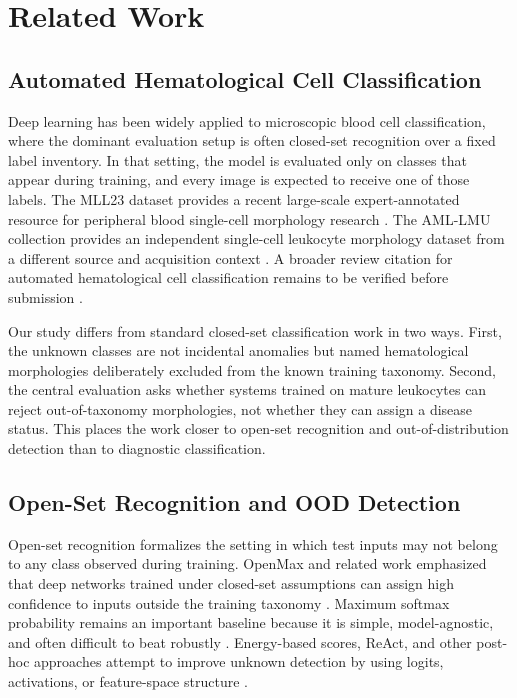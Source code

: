 \section{Related Work}

\subsection{Automated Hematological Cell Classification}

Deep learning has been widely applied to microscopic blood cell classification, where the dominant evaluation setup is often closed-set recognition over a fixed label inventory. In that setting, the model is evaluated only on classes that appear during training, and every image is expected to receive one of those labels. The MLL23 dataset provides a recent large-scale expert-annotated resource for peripheral blood single-cell morphology research \cite{mll23_nature_2025,mll23_zenodo_2024}. The AML-LMU collection provides an independent single-cell leukocyte morphology dataset from a different source and acquisition context \cite{aml_lmu_tcia_2019}. A broader review citation for automated hematological cell classification remains to be verified before submission \cite{TODO_hematology_ai_review}.

Our study differs from standard closed-set classification work in two ways. First, the unknown classes are not incidental anomalies but named hematological morphologies deliberately excluded from the known training taxonomy. Second, the central evaluation asks whether systems trained on mature leukocytes can reject out-of-taxonomy morphologies, not whether they can assign a disease status. This places the work closer to open-set recognition and out-of-distribution detection than to diagnostic classification.

\subsection{Open-Set Recognition and OOD Detection}

Open-set recognition formalizes the setting in which test inputs may not belong to any class observed during training. OpenMax and related work emphasized that deep networks trained under closed-set assumptions can assign high confidence to inputs outside the training taxonomy \cite{bendale2016openmax}. Maximum softmax probability remains an important baseline because it is simple, model-agnostic, and often difficult to beat robustly \cite{hendrycks2017baseline}. Energy-based scores, ReAct, and other post-hoc approaches attempt to improve unknown detection by using logits, activations, or feature-space structure \cite{liu2020energy,sun2021react}.

